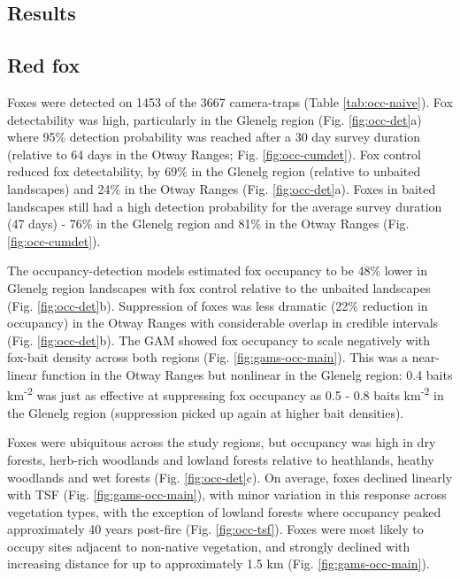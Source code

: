 \documentclass[11pt,a4paper,titlepage,twoside,openright]{style/unimelbthesis}
\begin{document}
\begin{mainmatter}
\hypertarget{results-1}{%
\section{Results}\label{results-1}}

\hypertarget{red-fox-1}{%
\subsection{Red fox}\label{red-fox-1}}

Foxes were detected on 1453 of the 3667 camera-traps (Table \ref{tab:occ-naive}). Fox detectability was high, particularly in the Glenelg region (Fig. \ref{fig:occ-det}a) where 95\% detection probability was reached after a 30 day survey duration (relative to 64 days in the Otway Ranges; Fig. \ref{fig:occ-cumdet}). Fox control reduced fox detectability, by 69\% in the Glenelg region (relative to unbaited landscapes) and 24\% in the Otway Ranges (Fig. \ref{fig:occ-det}a). Foxes in baited landscapes still had a high detection probability for the average survey duration (47 days) - 76\% in the Glenelg region and 81\% in the Otway Ranges (Fig. \ref{fig:occ-cumdet}).

The occupancy-detection models estimated fox occupancy to be 48\% lower in Glenelg region landscapes with fox control relative to the unbaited landscapes (Fig. \ref{fig:occ-det}b). Suppression of foxes was less dramatic (22\% reduction in occupancy) in the Otway Ranges with considerable overlap in credible intervals (Fig. \ref{fig:occ-det}b). The GAM showed fox occupancy to scale negatively with fox-bait density across both regions (Fig. \ref{fig:gams-occ-main}). This was a near-linear function in the Otway Ranges but nonlinear in the Glenelg region: 0.4 baits km\textsuperscript{-2} was just as effective at suppressing fox occupancy as 0.5 - 0.8 baits km\textsuperscript{-2} in the Glenelg region (suppression picked up again at higher bait densities).

Foxes were ubiquitous across the study regions, but occupancy was high in dry forests, herb-rich woodlands and lowland forests relative to heathlands, heathy woodlands and wet forests (Fig. \ref{fig:occ-det}c). On average, foxes declined linearly with TSF (Fig. \ref{fig:gams-occ-main}), with minor variation in this response across vegetation types, with the exception of lowland forests where occupancy peaked approximately 40 years post-fire (Fig. \ref{fig:occ-tsf}). Foxes were most likely to occupy sites adjacent to non-native vegetation, and strongly declined with increasing distance for up to approximately 1.5 km (Fig. \ref{fig:gams-occ-main}).


\end{mainmatter}
\end{document}

